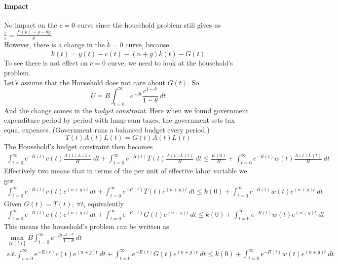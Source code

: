 \documentclass[11pt]{article}
\begin{document}
			\paragraph{Impact}No impact on the $\dot{c} = 0$ curve since the household problem still gives us $\frac{\dot{c}}{c} = \frac{f'(k)-\rho-\theta g}{\theta}$. \\
			However, there is a change in the $\dot{k}=0$ curve, because 
			\begin{equation}
				\dot{k}(t) = y(t) - c(t) - (n+g)k(t) - G(t)
			\end{equation}
			To see there is not effect on $\dot{c}=0$ curve, we need to look at the household's problem. \\
			Let's assume that the Household does not care about $G(t)$. So
			\[
				U = B\int_{t=0}^\infty e^{-\beta t} \frac{c^{1-\theta}}{1-\theta}\ dt
			\]
			And the change comes in the \emph{budget constraint}. Here when we found government expenditure period by period with lump-sum taxes, the government sets tax equal expenses. (Government runs a balanced budget every period.)
			\[
				T(t)A(t)L(t) = G(t)A(t)L(t)
			\]
			The Household's budget constraint then becomes 
			\begin{gather*}
				\int_{t=0}^\infty e^{-R(t)} c(t)\frac{A(t)L(t)}{H}\ dt + \int_{t=0}^\infty e^{-R(t)} T(t) \frac{A(t)L(t)}{H}\ dt \leq \frac{K(0)}{H} + \int_{t=0}^\infty e^{-R(t)} w(t) \frac{A(t)L(t)}{H}\ dt
			\end{gather*}
			Effectively two means that in terms of the per unit of effective labor variable we got 
			\begin{gather*}
				\int_{t=0}^\infty e^{-R(t)} c(t) e^{(n+g)t}\ dt + \int_{t=0}^\infty e^{-R(t)} T(t) e^{(n+g)t}\ dt \leq k(0) + \int_{t=0}^\infty e^{-R(t)} w(t) e^{(n+g)t} \ dt
			\end{gather*}
			Given $G(t) = T(t),\ \forall t$, equivalently
			\begin{gather*}
				\int_{t=0}^\infty e^{-R(t)} c(t) e^{(n+g)t}\ dt + \int_{t=0}^\infty e^{-R(t)} G(t) e^{(n+g)t}\ dt \leq k(0) + \int_{t=0}^\infty e^{-R(t)} w(t) e^{(n+g)t} \ dt
			\end{gather*}
			This means the household's problem can be written as 
			\begin{gather*}
				\max_{\{c(t)\}} B\int_{t=0}^\infty e^{-\beta t} \frac{c^{1-\theta}}{1-\theta}\ dt \\
				s.t. \int_{t=0}^\infty e^{-R(t)} c(t) e^{(n+g)t}\ dt + \int_{t=0}^\infty e^{-R(t)} G(t) e^{(n+g)t}\ dt \leq k(0) + \int_{t=0}^\infty e^{-R(t)} w(t) e^{(n+g)t} \ dt
			\end{gather*}
\end{document}
